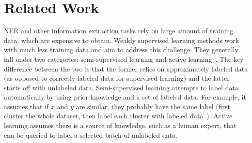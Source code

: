 \section{Related Work}
\label{sect:apner_related}
NER and other information extraction tasks rely on large amount of training data, which are expensive to obtain.
Weakly supervised learning methods work with much less training data and aim to address this challenge.
They generally fall under two categories: semi-supervised learning and active learning~\cite{zhou2017brief}.
The key difference between the two is that the former relies on approximately labeled data (as opposed to correctly labeled data for supervised learning) and the latter starts off with unlabeled data.
Semi-supervised learning attempts to label data automatically by using prior knowledge and a set of labeled data. 
For example, it assumes that if $x$ and $y$ are similar, they probably have the same label (first cluster the whole dataset, then label each cluster with labeled data~\cite{zhu2005semi}).
Active learning assumes there is a source of knowledge, such as a human expert, that can be queried 
to label a selected batch of unlabeled data. 

